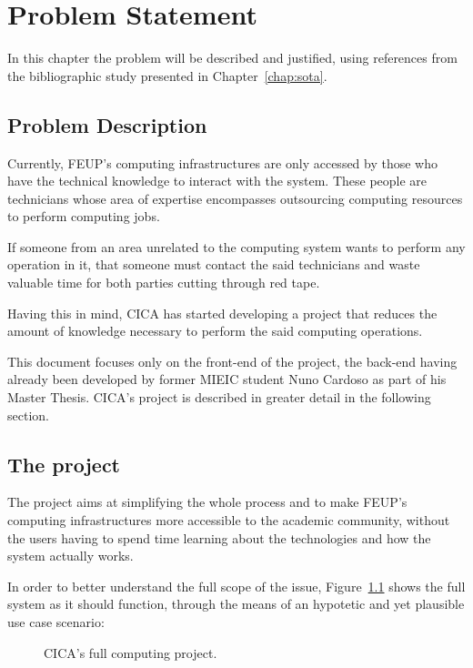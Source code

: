 \chapter{Problem Statement} \label{chap:chap3}

In this chapter the problem will be described and justified, using references from the bibliographic study presented in Chapter~\ref{chap:sota}.

\section{Problem Description}

Currently, FEUP's computing infrastructures are only accessed by those who have the technical knowledge to interact with the system. These people are technicians whose area of expertise encompasses outsourcing computing resources to perform computing jobs. 

If someone from an area unrelated to the computing system wants to perform any operation in it, that someone must contact the said technicians and waste valuable time for both parties cutting through red tape.

Having this in mind, CICA has started developing a project that reduces the amount of knowledge necessary to perform the said computing operations.

This document focuses only on the front-end of the project, the back-end having already been developed by former MIEIC student Nuno Cardoso as part of his Master Thesis. CICA's project is described in greater detail in the following section.

\section{The project} \label{sec:project}


The project aims at simplifying the whole process and to make FEUP's computing infrastructures more accessible to the academic community, without the users having to spend time learning about the technologies and how the system actually works.

In order to better understand the full scope of the issue, Figure~\ref{fig:big_picture} shows the full system as it should function, through the means of an hypotetic and yet plausible use case scenario:

\begin{figure}[h!]
  \begin{center}
    \leavevmode
    \caption{CICA's full computing project.}
    \label{fig:big_picture}
  \end{center}
\end{figure}

